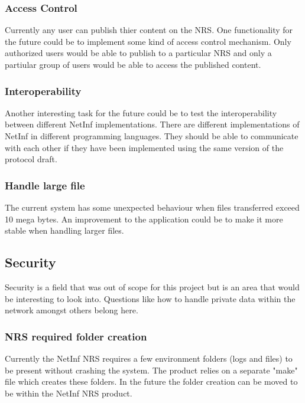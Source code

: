 \subsubsection{Access Control}

Currently any user can publish thier content on the NRS. One functionality for the future could be to implement some 
kind of access control mechanism. Only authorized users would be able to publish to a particular NRS and only a partiular 
group of users would be able to access the published content. 

\subsubsection{Interoperability}

Another interesting task for the future could be to test the interoperability between different NetInf implementations. 
There are different implementations of NetInf in different programming languages. They should be able to communicate with 
each other if they have been implemented using the same version of the protocol draft. 

\subsubsection{Handle large file}

The current system has some unexpected behaviour when files transferred exceed 10 mega bytes. An improvement to the 
application could be to make it more stable when handling larger files.

\subsection{Security}

Security is a field that was out of scope for this project but is an area that would be interesting to look into. 
Questions like how to handle private data within the network amongst others belong here.

\subsubsection{NRS required folder creation}

Currently the NetInf NRS requires a few environment folders (logs and files) to be present without crashing the system. 
The product relies on a separate "make" file which creates these folders. In the future the folder creation can be moved to be within the NetInf NRS product.

